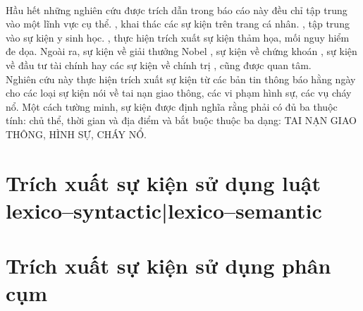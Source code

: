 \\
\noindent Hầu hết những nghiên cứu được trích dẫn trong báo cáo này đều chỉ tập trung vào một lĩnh vực cụ thể. \cite{MM09}, \cite{YKW09} khai thác các sự kiện trên trang cá nhân.  \cite{CVJ09}, \cite{CHR04} tập trung vào sự kiện y sinh học. \cite{HJM08}, \cite{JHP07} thực hiện trích xuất sự kiện thảm họa, mối nguy hiểm đe dọa. Ngoài ra, sự kiện về giải thưởng Nobel \cite{FHH06}, sự kiện về chứng khoán \cite{FHD02}, sự kiện về đầu tư tài chính \cite{CM00} hay các sự kiện về chính trị \cite{FK08}, \cite{CM00} cũng được quan tâm.
\\
\noindent Nghiên cứu này thực hiện trích xuất sự kiện từ các bản tin thông báo hằng ngày cho các loại sự kiện nói về tai nạn giao thông, các vi phạm hình sự, các vụ cháy nổ. Một cách tường minh,  sự kiện được định nghĩa  rằng phải có đủ ba thuộc tính: chủ thể, thời gian và địa điểm và bắt buộc thuộc ba dạng: TAI NẠN GIAO THÔNG, HÌNH SỰ, CHÁY NỔ.


\section{Trích xuất sự kiện sử dụng luật lexico--syntactic|lexico--semantic}


\section{Trích xuất sự kiện sử dụng phân cụm}





